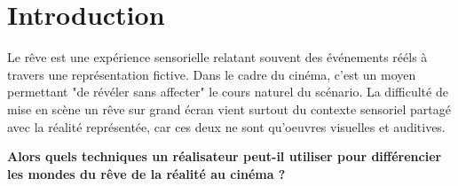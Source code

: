 \documentclass[../main.tex]{subfile}
\begin{document}
\section{Introduction}

Le rêve est une expérience sensorielle relatant souvent des événements rééls à
travers une représentation fictive. Dans le cadre du cinéma, c'est un moyen
permettant "de révéler sans affecter" le cours naturel du scénario. La
difficulté de mise en scène un rêve sur grand écran vient surtout du contexte
sensoriel partagé avec la réalité représentée, car ces deux ne sont qu'oeuvres
visuelles et auditives.

{\bfseries \large Alors quels techniques un réalisateur peut-il utiliser pour
    différencier les mondes du rêve de la réalité au cinéma ? \\}
\end{document}
